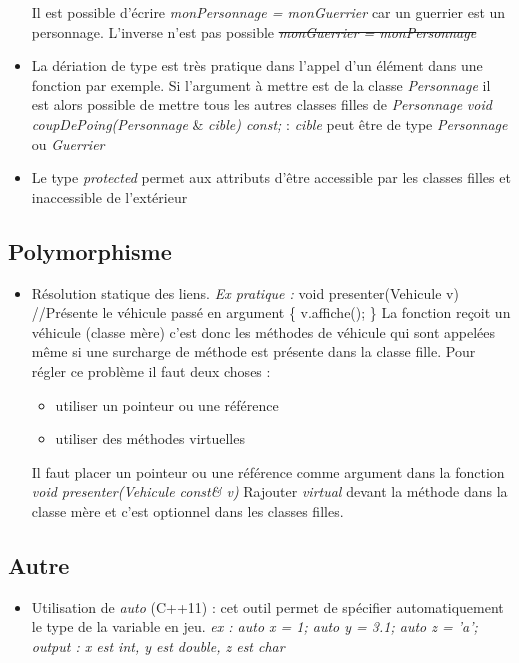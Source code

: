 \documentclass[12pt,a4paper]{article}
\begin{document}
\begin{itemize}
\newline Il est possible d'écrire \textit{monPersonnage = monGuerrier} car un guerrier est un personnage. L'inverse n'est pas possible \sout{\textit{monGuerrier = monPersonnage}}
\item La dériation de type est très pratique dans l'appel d'un élément dans une fonction par exemple. Si l'argument à mettre est de la classe \textit{Personnage} il est alors possible de mettre tous les autres classes filles de \textit{Personnage}
\newline \textit{void coupDePoing(Personnage} \& \textit{cible) const;} : \textit{cible} peut être de type \textit{Personnage} ou \textit{Guerrier}
\item Le type \textit{protected} permet aux attributs d'être accessible par les classes filles et inaccessible de l'extérieur
\end{itemize}

\subsection{Polymorphisme}
\begin{itemize}
\item Résolution statique des liens. \textit{Ex pratique : } 
\newline void presenter(Vehicule v)  //Présente le véhicule passé en argument
\newline \{  v.affiche(); \}
\newline La fonction reçoit un véhicule (classe mère) c’est donc les méthodes de véhicule qui sont appelées même si une surcharge de méthode est présente dans la classe fille.
Pour régler ce problème il faut deux choses :
\begin{itemize}
\item utiliser un pointeur ou une référence
\item utiliser des méthodes virtuelles
\end{itemize}
Il faut placer un pointeur ou une référence comme argument dans la fonction \textit{void presenter(Vehicule const\& v)}
\newline Rajouter \textit{virtual} devant la méthode dans la classe mère et c’est optionnel dans les classes filles.
\end{itemize}

\subsection{Autre}
\begin{itemize}
\item Utilisation de \textit{auto} (C++11) : cet outil permet de spécifier automatiquement le type de la variable en jeu. 
\newline \textit{ex : auto x = 1; auto y = 3.1; auto z = 'a';}
\newline \textit{output : x est int, y est double, z est char}
\end{itemize}
\end{document}

